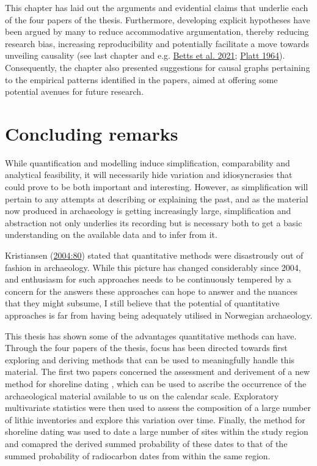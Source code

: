 \documentclass[
  12pt,
  a4paper,
  oneside]{book}
\begin{document}
This chapter has laid out the arguments and evidential claims that underlie each of the four papers of the thesis. Furthermore, developing explicit hypotheses have been argued by many to reduce accommodative argumentation, thereby reducing research bias, increasing reproducibility and potentially facilitate a move towards unveiling causality (see last chapter and e.g. \protect\hyperlink{ref-betts2021}{Betts et al. 2021}; \protect\hyperlink{ref-platt1964}{Platt 1964}). Consequently, the chapter also presented suggestions for causal graphs pertaining to the empirical patterns identified in the papers, aimed at offering some potential avenues for future research.

\hypertarget{concluding-remarks}{%
\chapter{Concluding remarks}\label{concluding-remarks}}

While quantification and modelling induce simplification, comparability and analytical feasibility, it will necessarily hide variation and idiosyncrasies that could prove to be both important and interesting. However, as simplification will pertain to any attempts at describing or explaining the past, and as the material now produced in archaeology is getting increasingly large, simplification and abstraction not only underlies its recording but is necessary both to get a basic understanding on the available data and to infer from it.

Kristiansen (\protect\hyperlink{ref-kristiansen2004}{2004:80}) stated that quantitative methods were \textquotesingle disastrously out of fashion\textquotesingle{} in archaeology. While this picture has changed considerably since 2004, and enthusiasm for such approaches needs to be continuously tempered by a concern for the answers these approaches can hope to answer and the nuances that they might subsume, I still believe that the potential of quantitative approaches is far from having being adequately utilised in Norwegian archaeology.

This thesis has shown some of the advantages quantitative methods can have. Through the four papers of the thesis, focus has been directed towards first exploring and deriving methods that can be used to meaningfully handle this material. The first two papers concerned the assessment and derivement of a new method for shoreline dating , which can be used to ascribe the occurrence of the archaeological material available to us on the calendar scale. Exploratory multivariate statistics were then used to assess the composition of a large number of lithic inventories and explore this variation over time. Finally, the method for shoreline dating was used to date a large number of sites within the study region and comapred the derived summed probability of these dates to that of the summed probability of radiocarbon dates from within the same region.
\end{document}
